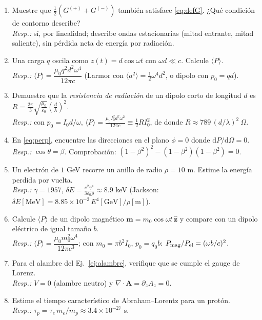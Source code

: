 \documentclass[11pt,a4paper]{article}
\newcommand{\dd}{\mathrm d}
\theoremstyle{remark}
\begin{document}
\begin{enumerate}[label=\textbf{P\arabic*.},itemsep=0.6em,leftmargin=2.2em]
\item Muestre que $\frac12\left(G^{(+)}+G^{(-)}\right)$ también satisface \eqref{eq:defG}. ¿Qué
condición de contorno describe? \\
\textit{Resp.:} sí, por linealidad; describe ondas estacionarias (mitad entrante, mitad saliente), sin
pérdida neta de energía por radiación.

\item Una carga $q$ oscila como $z(t)=d\cos\omega t$ con $\omega d\ll c$. Calcule $\langle P\rangle$. \\
\textit{Resp.:} $\langle P\rangle=\dfrac{\mu_0q^2d^2\omega^4}{12\pi c}$ (Larmor con $\langle a^2\rangle=\frac12\omega^4d^2$, o dipolo con $p_0=qd$).

\item Demuestre que la \emph{resistencia de radiación} de un dipolo corto de longitud $d$ es
$R=\frac{2\pi}{3}\sqrt{\frac{\mu_0}{\varepsilon_0}}\left(\frac d\lambda\right)^2$. \\
\textit{Resp.:} con $p_0=I_0d/\omega$, $\langle P\rangle=\frac{\mu_0I_0^2d^2\omega^2}{12\pi c}\equiv\frac12RI_0^2$, de donde
$R\approx789\,(d/\lambda)^2\ \Omega$.

\item En \eqref{eq:perp}, encuentre las direcciones en el plano $\phi=0$ donde $\dd P/\dd\Omega=0$. \\
\textit{Resp.:} $\cos\theta=\beta$. Comprobación: $(1-\beta^2)^2-(1-\beta^2)(1-\beta^2)=0$.

\item Un electrón de $1$ GeV recorre un anillo de radio $\rho=10$ m. Estime la energía perdida por vuelta. \\
\textit{Resp.:} $\gamma=1957$, $\delta E=\frac{e^2\gamma^4}{3\varepsilon_0\rho}\approx8.9$ keV
(Jackson: $\delta E[\text{MeV}]=8.85\times10^{-2}\,E^4[\text{GeV}]/\rho[\text{m}]$).

\item Calcule $\langle P\rangle$ de un dipolo magnético $\mathbf m=m_0\cos\omega t\,\hat{\mathbf z}$ y compare
con un dipolo eléctrico de igual tamaño $b$. \\
\textit{Resp.:} $\langle P\rangle=\dfrac{\mu_0m_0^2\omega^4}{12\pi c^3}$; con $m_0=\pi b^2I_0$, $p_0=q_0b$:
$P_{\rm mag}/P_{\rm el}=(\omega b/c)^2$.

\item Para el alambre del Ej.~\ref{ej:alambre}, verifique que se cumple el gauge de Lorenz. \\
\textit{Resp.:} $V=0$ (alambre neutro) y $\nabla\cdot\mathbf A=\partial_zA_z=0$. \checkmark

\item Estime el tiempo característico de Abraham--Lorentz para un protón. \\
\textit{Resp.:} $\tau_p=\tau_e\,m_e/m_p\approx3.4\times10^{-27}$ s.
\end{enumerate}
\end{document}
